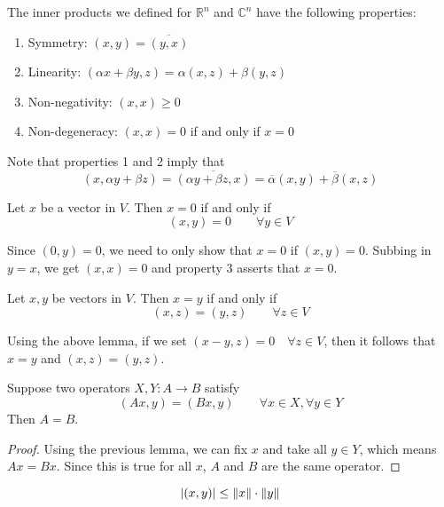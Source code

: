 The inner products we defined for $\mathbb{R}^{n}$ and $\mathbb{C}^{n}$	have the following properties: 
\begin{enumerate}
	\item Symmetry: $(x, y) = \overline{(y, x)}$
	\item Linearity: $(\alpha x + \beta y, z) = \alpha (x, z) + \beta (y, z)$
	\item Non-negativity: $(x, x) \geq 0$ 
	\item Non-degeneracy: $(x, x) = 0$ if and only if $x = 0$
\end{enumerate}

Note that properties 1 and 2 imply that 
$$(x, \alpha y + \beta z) = \overline{(\alpha y + \beta z, x)} = \overline{\alpha} (x, y) + \overline{\beta} (x, z)$$

\begin{lemma}
Let $x$ be a vector in $V$. Then $x = 0$ if and only if  
$$(x, y) = 0 \qquad \forall y \in V$$
\end{lemma}

\begin{lproof}
Since $(0, y) = 0$, we need to only show that $x = 0$ if $(x, y) = 0$. Subbing in $y = x$, we get $(x, x) = 0$ and property 3 asserts that $x = 0$. 
\end{lproof}

\begin{lemma}
Let $x, y$ be vectors in $V$. Then $x = y$ if and only if  
$$(x, z) = (y, z) \qquad \forall z \in V$$
\end{lemma}

\begin{lproof}
Using the above lemma, if we set $(x - y, z) = 0 \quad \forall z \in V$, then it follows that $x = y$ and $(x, z) = (y, z)$. 

\end{lproof}

\begin{theorem}
Suppose two operators $X, Y : A \rightarrow B$ satisfy 
$$(Ax, y) = (Bx, y) \qquad \forall x \in X, \forall y \in Y$$
Then $A = B$. 
\end{theorem}

\begin{proof}
Using the previous lemma, we can fix $x$ and take all $y \in Y$, which means $Ax = Bx$. Since this is true for all $x$, $A$ and $B$ are the same operator. 
\end{proof}

\begin{theorem}
$$\lvert(x, y)\rvert \leq \lVert x\rVert \cdot \lVert y\rVert$$
\end{theorem}

